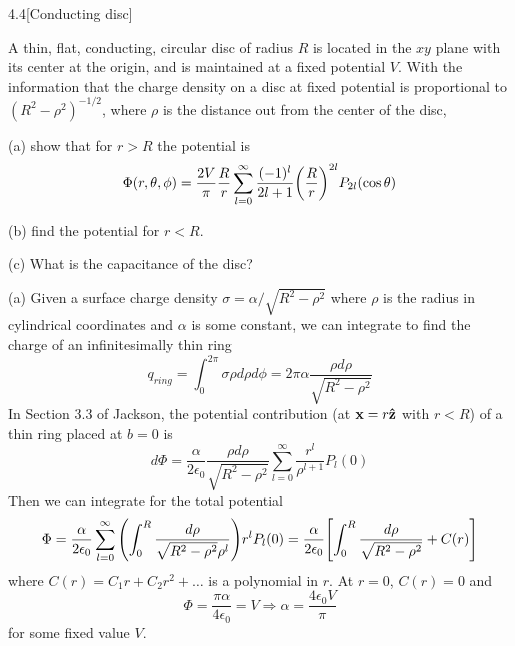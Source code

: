 \documentclass[12pt]{article}
\begin{document}
\begin{problem}{4.4}[Conducting disc]

A thin, flat, conducting, circular disc of radius $R$ is located in the $xy$
plane with its center at the origin, and is maintained at a fixed potential $V$.
With the information that the charge density on a disc at fixed potential is
proportional to $(R^2-\rho^2)^{-1 /2}$, where $\rho$ is the distance out from
the center of the disc,

(a) show that for $r>R$ the potential is
\begin{equation}
    \Phi(r,\theta,\phi)=\frac{2V}{\pi}\frac{R}{r}\sum_{l=0}^\infty\frac{(-1)^l}{2l+1}\qty(\frac{R}{r})^{2l}P_{2l}(\cos\theta) 
\end{equation}

(b) find the potential for $r<R$.

(c) What is the capacitance of the disc?
\begin{solution}
(a) Given a surface charge density $\sigma=\alpha /\sqrt{R^2-\rho^2}$ where
$\rho$ is the radius in cylindrical coordinates and $\alpha$ is some constant, 
we can integrate to find the charge of an infinitesimally thin ring
\begin{equation}
    q_{ring}=\int_0^{2\pi}\sigma\rho d\rho d\phi=2\pi\alpha\frac{\rho
    d\rho}{\sqrt{R^2-\rho^2}} 
\end{equation}
In Section 3.3 of Jackson, the potential contribution (at $\vb{x}=r\vb{\hat{z}}$ with 
$r<R$) of a thin ring placed at $b=0$ is
\begin{equation}
    d\Phi=\frac{\alpha}{2\epsilon_0}\frac{\rho
    d\rho}{\sqrt{R^2-\rho^2}}\sum_{l=0}^\infty\frac{r^l}{\rho^{l+1}}P_l(0) 
\end{equation}
Then we can integrate for the total potential
\begin{align}
    \Phi
    =\frac{\alpha}{2\epsilon_0}\sum_{l=0}^\infty\qty(\int_0^R\frac{d\rho}{\sqrt{R^2-\rho^2}\rho^l})r^lP_l(0)
=\frac{\alpha}{2\epsilon_0}\qty[\int_0^R\frac{d\rho}{\sqrt{R^2-\rho^2}}+C(r)]
\end{align}
where $C(r)=C_1r+C_2r^2+\ldots$ is a polynomial in $r$. At $r=0$, $C(r)=0$ and
\begin{equation}
    \Phi=\frac{\pi\alpha}{4\epsilon_0}=V\Rightarrow\alpha=\frac{4\epsilon_0V}{\pi}
\end{equation}
for some fixed value $V$.


\end{solution}
\end{problem}
\end{document}
